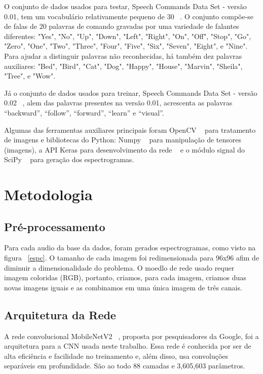 \documentclass{bmvc2k}
\begin{document}
\newpage

O conjunto de dados usados para testar, Speech Commands Data Set - versão 0.01, tem um vocabulário relativamente pequeno de 30 ~\cite{speechcommandsv2}. O conjunto compõe-se de falas de 20 palavras de comando gravadas por uma variedade de falantes diferentes:  "Yes", "No", "Up", "Down", "Left", "Right", "On", "Off", "Stop", "Go", "Zero", "One", "Two", "Three", "Four", "Five", "Six", "Seven", "Eight", e "Nine". Para ajudar a distinguir palavras não reconhecidas, há também dez palavras auxiliares:  "Bed", "Bird", "Cat", "Dog", "Happy", "House", "Marvin", "Sheila", "Tree", e "Wow".

Já o conjunto de dados usados para treinar, Speech Commands Data Set - versão 0.02  ~\cite{speechcommandsv2}, alem das palavras presentes na versão 0.01, acrescenta as palavras ``backward'', ``follow'', ``forward'', ``learn'' e ``visual''.

Algumas das ferramentas auxiliares principais foram OpenCV ~\cite{openCV} para tratamento de imagens e bibliotecas do Python: Numpy ~\cite{numpy} para manipulação de tensores (imagens), a API Keras para desenvolvimento da rede ~\cite{keras} e o módulo signal do SciPy ~\cite{scipy} para geração dos espectrogramas.


\section{Metodologia}

\subsection*{Pré-processamento}

Para cada audio da base da dados, foram gerados espectrogramas, como visto na figura ~\ref{espc}. O tamanho de cada imagem foi redimensionada para 96x96 afim de diminuir a dimensionalidade do problema. O moedlo de rede usado requer imagem coloridas (RGB), portanto, criamos, para cada imagem, criamos duas novas imagens iguais e as combinamos em uma única imagem de três canais.



\subsection*{Arquitetura da Rede}

A rede convolucional MobileNetV2 ~\cite{mobilenets}, proposta por pesquisadores da Google, foi a arquitetura para a CNN usada neste trabalho. Essa rede é conhecida por ser de alta eficiência 
e facilidade no treinamento e, além disso, usa convoluções separáveis em profundidade. São ao todo 88 camadas e 3,605,603 parâmetros.
\end{document}
